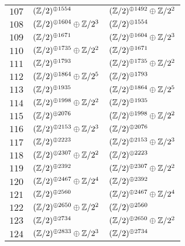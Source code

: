 \begin{supertabular}{|c|p{5.5cm}|p{5.5cm}|}
$107$%
&$(\mathbb{Z}/2)^{\oplus1554}$%
&$(\mathbb{Z}/2)^{\oplus1492}\oplus\mathbb{Z}/2^{2}$\\

$108$%
&$(\mathbb{Z}/2)^{\oplus1604}\oplus\mathbb{Z}/2^{3}$%
&$(\mathbb{Z}/2)^{\oplus1554}$\\

$109$%
&$(\mathbb{Z}/2)^{\oplus1671}$%
&$(\mathbb{Z}/2)^{\oplus1604}\oplus\mathbb{Z}/2^{3}$\\

$110$%
&$(\mathbb{Z}/2)^{\oplus1735}\oplus\mathbb{Z}/2^{2}$%
&$(\mathbb{Z}/2)^{\oplus1671}$\\

$111$%
&$(\mathbb{Z}/2)^{\oplus1793}$%
&$(\mathbb{Z}/2)^{\oplus1735}\oplus\mathbb{Z}/2^{2}$\\

$112$%
&$(\mathbb{Z}/2)^{\oplus1864}\oplus\mathbb{Z}/2^{5}$%
&$(\mathbb{Z}/2)^{\oplus1793}$\\

$113$%
&$(\mathbb{Z}/2)^{\oplus1935}$%
&$(\mathbb{Z}/2)^{\oplus1864}\oplus\mathbb{Z}/2^{5}$\\

$114$%
&$(\mathbb{Z}/2)^{\oplus1998}\oplus\mathbb{Z}/2^{2}$%
&$(\mathbb{Z}/2)^{\oplus1935}$\\

$115$%
&$(\mathbb{Z}/2)^{\oplus2076}$%
&$(\mathbb{Z}/2)^{\oplus1998}\oplus\mathbb{Z}/2^{2}$\\

$116$%
&$(\mathbb{Z}/2)^{\oplus2153}\oplus\mathbb{Z}/2^{3}$%
&$(\mathbb{Z}/2)^{\oplus2076}$\\

$117$%
&$(\mathbb{Z}/2)^{\oplus2223}$%
&$(\mathbb{Z}/2)^{\oplus2153}\oplus\mathbb{Z}/2^{3}$\\

$118$%
&$(\mathbb{Z}/2)^{\oplus2307}\oplus\mathbb{Z}/2^{2}$%
&$(\mathbb{Z}/2)^{\oplus2223}$\\

$119$%
&$(\mathbb{Z}/2)^{\oplus2392}$%
&$(\mathbb{Z}/2)^{\oplus2307}\oplus\mathbb{Z}/2^{2}$\\

$120$%
&$(\mathbb{Z}/2)^{\oplus2467}\oplus\mathbb{Z}/2^{4}$%
&$(\mathbb{Z}/2)^{\oplus2392}$\\

$121$%
&$(\mathbb{Z}/2)^{\oplus2560}$%
&$(\mathbb{Z}/2)^{\oplus2467}\oplus\mathbb{Z}/2^{4}$\\

$122$%
&$(\mathbb{Z}/2)^{\oplus2650}\oplus\mathbb{Z}/2^{2}$%
&$(\mathbb{Z}/2)^{\oplus2560}$\\

$123$%
&$(\mathbb{Z}/2)^{\oplus2734}$%
&$(\mathbb{Z}/2)^{\oplus2650}\oplus\mathbb{Z}/2^{2}$\\

$124$%
&$(\mathbb{Z}/2)^{\oplus2833}\oplus\mathbb{Z}/2^{3}$%
&$(\mathbb{Z}/2)^{\oplus2734}$\\


\end{supertabular}
